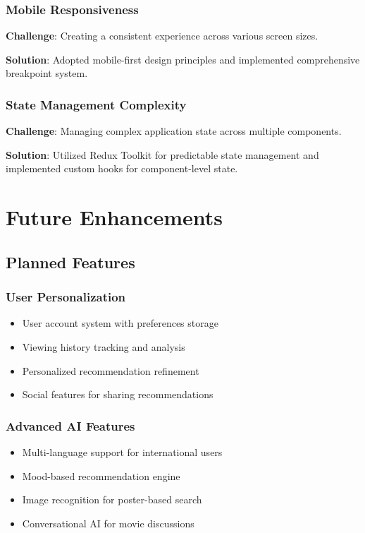 \documentclass[12pt,a4paper]{article}
\begin{document}
\subsubsection{Mobile Responsiveness}
\textbf{Challenge}: Creating a consistent experience across various screen sizes.

\textbf{Solution}: Adopted mobile-first design principles and implemented comprehensive breakpoint system.

\subsubsection{State Management Complexity}
\textbf{Challenge}: Managing complex application state across multiple components.

\textbf{Solution}: Utilized Redux Toolkit for predictable state management and implemented custom hooks for component-level state.

\section{Future Enhancements}

\subsection{Planned Features}

\subsubsection{User Personalization}
\begin{itemize}
    \item User account system with preferences storage
    \item Viewing history tracking and analysis
    \item Personalized recommendation refinement
    \item Social features for sharing recommendations
\end{itemize}

\subsubsection{Advanced AI Features}
\begin{itemize}
    \item Multi-language support for international users
    \item Mood-based recommendation engine
    \item Image recognition for poster-based search
    \item Conversational AI for movie discussions
\end{itemize}
\end{document}
